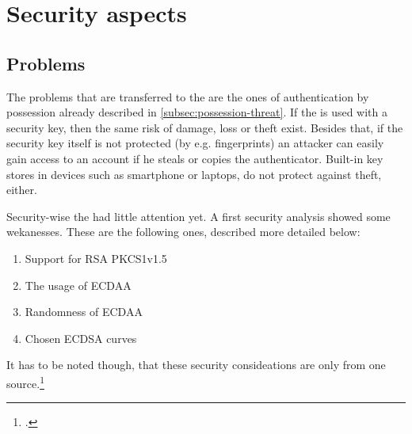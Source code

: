 \section{Security aspects}

\subsection{Problems}

The problems that are transferred to the \wa{} are the ones of authentication by possession already described in \autoref{subsec:possession-threat}. If the \wa{} is used with a security key, then the same risk of damage, loss or theft exist. Besides that, if the security key itself is not protected (by e.g. fingerprints) an attacker can easily gain access to an account if he steals or copies the authenticator. Built-in key stores in devices such as smartphone or laptops, do not protect against theft, either.

Security-wise the \wa{} had little attention yet. A first security analysis showed some wekanesses. These are the following ones, described more detailed below:

\begin{enumerate}
	\item Support for RSA PKCS1v1.5
	\item The usage of ECDAA
	\item Randomness of ECDAA
	\item Chosen ECDSA curves
\end{enumerate}

It has to be noted though, that these security consideations are only from one source.\footcite[See][]{paragon-webauth}